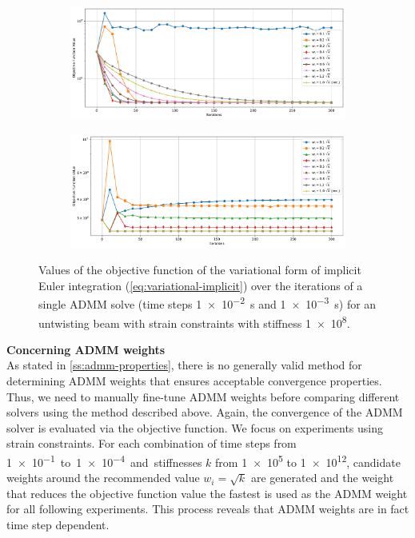 \begin{figure}[h]
    \centering
    \begin{subfigure}{\textwidth}
        \includegraphics[width=\linewidth]{figures/strain_admm_weights_1e-2.pdf}
    \end{subfigure}
    \begin{subfigure}{\textwidth}
        \includegraphics[width=\linewidth]{figures/strain_admm_weights_1e-3.pdf}
    \end{subfigure}
    \caption{Values of the objective function of the variational form of implicit Euler integration (\cref{eq:variational-implicit}) over the iterations of a single 
    ADMM solve (time steps \SI{1e-2}{\second} and \SI{1e-3}{\second}) for an untwisting beam with strain constraints with stiffness \num{1e8}.}\label{fig:strain-weights-admm}
\end{figure}

\noindent \textbf{Concerning ADMM weights}\\
\noindent As stated in \autoref{ss:admm-properties}, there is no generally valid method for determining ADMM weights that ensures acceptable convergence properties.
Thus, we need to manually fine-tune ADMM weights before comparing different solvers using the method described above. Again, the convergence of the ADMM solver is evaluated via 
the objective function. We focus on experiments using strain constraints. For each combination of time steps from \SI{1e-1} to \SI{1e-4} and stiffnesses $k$ from 
\num{1e5} to \num{1e12}, candidate weights around the recommended value $w_i = \sqrt{k}$ are generated and the weight that reduces the objective function value the 
fastest is used as the ADMM weight for all following experiments. This process reveals that ADMM weights are in fact time step dependent.

